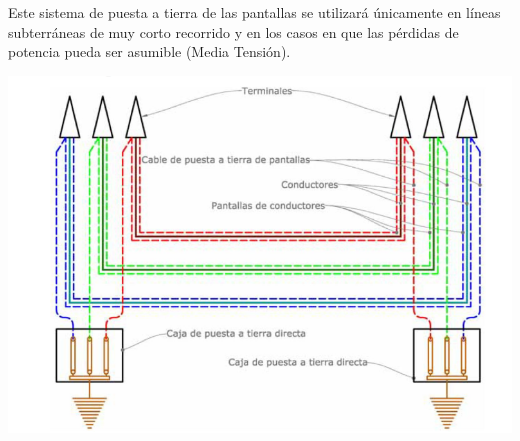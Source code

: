 \documentclass[10pt,a4paper]{article}
\begin{document}
Este sistema de puesta a tierra de las pantallas se utilizará únicamente en
líneas subterráneas de muy corto recorrido y en los casos en que las
pérdidas de potencia pueda ser asumible (Media Tensión).
\begin{center}
    \includegraphics[scale = 0.6]{SolidBonding.png}
\end{center}
\newpage
\end{document}
